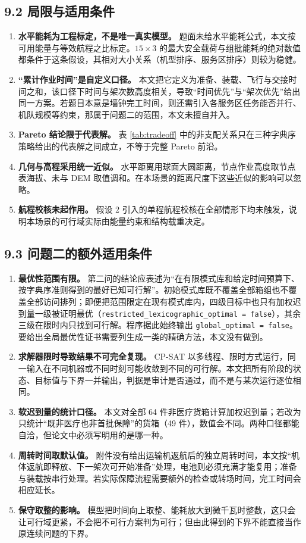\documentclass[withoutpreface,bwprint]{format}
\begin{document}
\subsection{9.2 局限与适用条件}
\begin{enumerate}[leftmargin=*]
    \item \textbf{水平能耗为工程标定，不是唯一真实模型。} 题面未给水平能耗公式，本文按可用能量与等效航程之比标定。$15\times3$ 的最大安全载荷与组批能耗的绝对数值都条件于这条假设，其相对大小关系（机型排序、服务区排序）则较为稳健。
    \item \textbf{“累计作业时间”是自定义口径。} 本文把它定义为准备、装载、飞行与交接时间之和，该口径下时间与架次数高度相关，导致“时间优先”与“架次优先”给出同一方案。若题目本意是墙钟完工时间，则还需引入各服务区任务能否并行、机队规模等约束，那属于问题二的范围，本文未擅自并入。
    \item \textbf{Pareto 结论限于代表解。} 表 \ref{tab:tradeoff} 中的非支配关系只在三种字典序策略给出的代表解之间成立，不等于完整 Pareto 前沿。
    \item \textbf{几何与高程采用统一近似。} 水平距离用球面大圆距离，节点作业高度取节点表海拔、未与 DEM 取值调和。在本场景的距离尺度下这些近似的影响可以忽略。
    \item \textbf{航程校核未起作用。} 假设 2 引入的单程航程校核在全部情形下均未触发，说明本场景的可行域实际由能量约束和结构载重决定。
\end{enumerate}

\subsection{9.3 问题二的额外适用条件}
\begin{enumerate}[leftmargin=*]
    \item \textbf{最优性范围有限。} 第二问的结论应表述为“在有限模式库和给定时间预算下、按字典序准则得到的最好已知可行解”。初始模式库既不覆盖全部箱组也不覆盖全部访问排列；即便把范围限定在现有模式库内，四级目标中也只有加权迟到量一级被证明最优（\texttt{restricted\_lexicographic\_optimal = false}），其余三级在限时内只找到可行解。程序据此始终输出 \texttt{global\_optimal = false}。要给出全局最优性证书需要列生成一类的精确方法，本文没有做到。
    \item \textbf{求解器限时导致结果不可完全复现。} CP-SAT 以多线程、限时方式运行，同一输入在不同机器或不同时刻可能收敛到不同的可行解。本文把所有阶段的状态、目标值与下界一并输出，判据是审计是否通过，而不是与某次运行逐位相同。
    \item \textbf{软迟到量的统计口径。} 本文对全部 64 件非医疗货箱计算加权迟到量；若改为只统计“既非医疗也非首批保障”的货箱（49 件），数值会不同。两种口径都能自洽，但论文中必须写明用的是哪一种。
    \item \textbf{周转时间取默认值。} 附件没有给出运输机返航后的独立周转时间，本文按“机体返航即释放、下一架次可开始准备”处理，电池则必须充满才能复用；准备与装载按串行处理。若实际保障流程需要额外的检查或转场时间，完工时间会相应延长。
    \item \textbf{保守取整的影响。} 模型把时间向上取整、能耗放大到微千瓦时整数，这只会让可行域更紧，不会把不可行方案判为可行；但由此得到的下界不能直接当作原连续问题的下界。
\end{enumerate}
\end{document}

